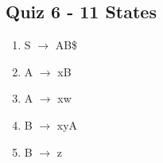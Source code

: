 \documentclass{report}
\begin{document}
\subsection{Quiz 6 - 11 States}
\vspace{-1.5em}
\begin{multicols}{2}
  \begin{enumerate}
    \setlength\itemsep{-.25em}
    \item S $\rightarrow$ AB\$
    \item A $\rightarrow$ xB
    \item A $\rightarrow$ xw
    \item B $\rightarrow$ xyA
    \item B $\rightarrow$ z
    \newline\newline\newline\newline\newline\newline\newline\newline\newline\newline\newline\newline\newline\newline
  \end{enumerate}
  \vspace{-50pt}
  \setlength{\leftskip}{-10em}

\end{multicols}
\end{document}
